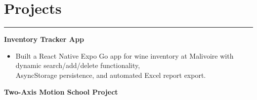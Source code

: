 \documentclass{article}
\begin{document}







\vspace{-0.5cm}     
\section*{\hspace{0.2cm} \large Projects}
\begin{center}
    \vspace{-0.5cm}
    \rule{\textwidth}{0.1pt}
\end{center}


\textbf{\hspace{-0.10cm} Inventory Tracker App} \hspace{5.3cm}

\vspace{-0.2cm}
\begin{itemize}[leftmargin=1.5cm]
    \item Built a React Native Expo Go app for wine inventory at Malivoire with dynamic search/add/delete functionality, \\ AsyncStorage persistence, and automated Excel report export.
\end{itemize}


\textbf{\hspace{-0.10cm} Two-Axis Motion School Project} \hspace{5.3cm}
\end{document}
